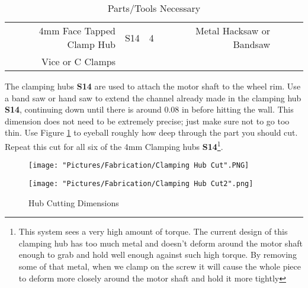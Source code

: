 \documentclass[12pt]{article}
\begin{document}
\begin{table}[H]
    \centering
    \sffamily\footnotesize
    \caption{Parts/Tools Necessary}
    \begin{tabular}{|N|Q|Q|I|N|Q|Q|I|}
        \hline
         &  &  &  &  &  &  &  \\
        \hline
        4mm Face Tapped Clamp Hub & S14 & 4 &  & Metal Hacksaw or Bandsaw & & &  \\ \hline
        Vice or C Clamps & & &  & & & & \\ \hline
    \end{tabular}
\end{table}

The clamping hubs \textbf{S14} are used to attach the motor shaft to the wheel rim. Use a band saw or hand saw to extend the channel already made in the clamping hub \textbf{S14}, continuing down until there is around 0.08 in before hitting the wall. This dimension does not need to be extremely precise; just make sure not to go too thin. Use Figure \ref{Clamping hub cut} to eyeball roughly how deep through the part you should cut. Repeat this cut for all six of the 4mm Clamping hubs \textbf{S14}\footnote{This system sees a very high amount of torque. The current design of this clamping hub has too much metal and doesn't deform around the motor shaft enough to grab and hold well enough against such high torque. By removing some of that metal, when we clamp on the screw it will cause the whole piece to deform more closely around the motor shaft and hold it more tightly}.




\begin{figure}[H]
  \centering
  \begin{minipage}[b]{0.45\textwidth}
    \texttt{[image: "Pictures/Fabrication/Clamping Hub Cut".PNG]}
  \end{minipage}
  \hfill
  \begin{minipage}[b]{0.45\textwidth}
    \texttt{[image: "Pictures/Fabrication/Clamping Hub Cut2".png]}
  \end{minipage}
  \caption{Hub Cutting Dimensions}
  \label{Clamping hub cut}
\end{figure}
\end{document}

